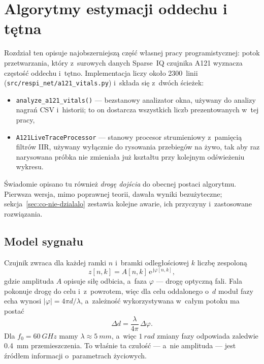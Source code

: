 \documentclass[12pt,a4paper,oneside]{report}
\begin{document}
\chapter{Algorytmy estymacji oddechu i tętna}
\label{chap:algorytmy}

Rozdział ten opisuje najobszerniejszą część własnej pracy programistycznej:
potok przetwarzania, który z~surowych danych Sparse~IQ czujnika A121 wyznacza
częstość oddechu i~tętno. Implementacja liczy około 2300~linii
(\texttt{src/\allowbreak respi\_net/\allowbreak a121\_vitals.py}) i~składa się z~dwóch ścieżek:
\begin{itemize}
  \item \texttt{analyze\_a121\_vitals()} --- bezstanowy analizator okna,
  używany do analizy nagrań CSV i~historii; to on dostarcza wszystkich liczb
  prezentowanych w~tej pracy,
  \item \texttt{A121LiveTraceProcessor} --- stanowy procesor strumieniowy
  z~pamięcią filtrów IIR, używany wyłącznie do rysowania przebiegów na żywo,
  tak aby raz narysowana próbka nie zmieniała już kształtu przy kolejnym
  odświeżeniu wykresu.
\end{itemize}

Świadomie opisano tu również \emph{drogę dojścia} do obecnej postaci
algorytmu. Pierwsza wersja, mimo poprawnej teorii, dawała wyniki bezużyteczne;
sekcja~\ref{sec:co-nie-dzialalo} zestawia kolejne awarie, ich przyczyny
i~zastosowane rozwiązania.

\section{Model sygnału}
\label{sec:model-sygnalu}
Czujnik zwraca dla każdej ramki $n$ i~bramki odległościowej $k$ liczbę
zespoloną
\begin{equation}
  z[n,k] = A[n,k]\,\mathrm{e}^{\,\mathrm{j}\varphi[n,k]},
  \label{eq:iq}
\end{equation}
gdzie amplituda $A$ opisuje siłę odbicia, a~faza $\varphi$ --- drogę optyczną
fali. Fala pokonuje drogę do celu i~z~powrotem, więc dla celu oddalonego
o~$d$ moduł fazy echa wynosi $|\varphi| = 4\pi d/\lambda$, a~zależność
wykorzystywana w~całym potoku ma postać
\begin{equation}
  \Delta d = \frac{\lambda}{4\pi}\,\Delta\varphi .
  \label{eq:faza-przemieszczenie}
\end{equation}
Dla $f_0 = \SI{60}{GHz}$ mamy $\lambda \approx \SI{5}{mm}$, a~więc
$\SI{1}{rad}$ zmiany fazy odpowiada zaledwie \SI{0.4}{mm} przemieszczenia.
To właśnie ta czułość --- a~nie amplituda --- jest źródłem informacji
o~parametrach życiowych.
\end{document}
